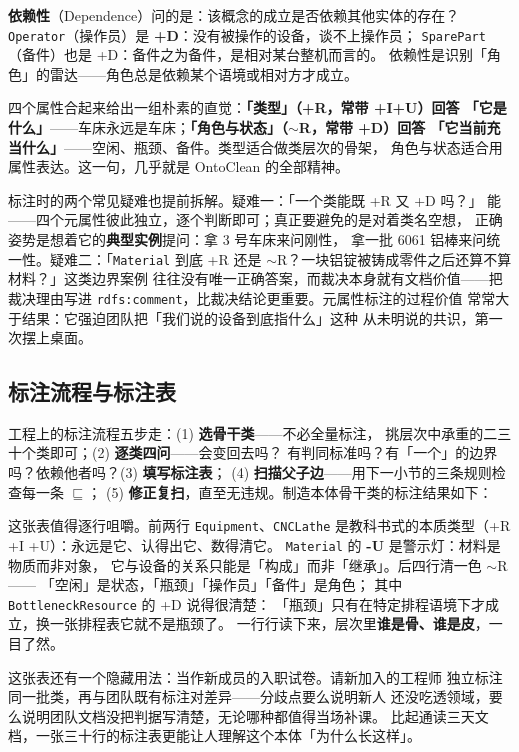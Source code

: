 \textbf{依赖性}（Dependence）问的是：该概念的成立是否依赖其他实体的存在？
\texttt{Operator}（操作员）是 \textbf{+D}：没有被操作的设备，谈不上操作员；
\texttt{SparePart}（备件）也是 +D：备件之为备件，是相对某台整机而言的。
依赖性是识别「角色」的雷达——角色总是依赖某个语境或相对方才成立。

四个属性合起来给出一组朴素的直觉：\textbf{「类型」（+R，常带 +I+U）回答
「它是什么」}——车床永远是车床；\textbf{「角色与状态」（\(\sim\)R，常带 +D）回答
「它当前充当什么」}——空闲、瓶颈、备件。类型适合做类层次的骨架，
角色与状态适合用属性表达。这一句，几乎就是 OntoClean 的全部精神。

标注时的两个常见疑难也提前拆解。疑难一：「一个类能既 +R 又 +D 吗？」
能——四个元属性彼此独立，逐个判断即可；真正要避免的是对着类名空想，
正确姿势是想着它的\textbf{典型实例}提问：拿 3 号车床来问刚性，
拿一批 6061 铝棒来问统一性。疑难二：「\texttt{Material} 到底 +R 还是
\(\sim\)R？一块铝锭被铸成零件之后还算不算材料？」这类边界案例
往往没有唯一正确答案，而裁决本身就有文档价值——把裁决理由写进
\texttt{rdfs:comment}，比裁决结论更重要。元属性标注的过程价值
常常大于结果：它强迫团队把「我们说的设备到底指什么」这种
从未明说的共识，第一次摆上桌面。

\subsection{标注流程与标注表}

工程上的标注流程五步走：(1) \textbf{选骨干类}——不必全量标注，
挑层次中承重的二三十个类即可；(2) \textbf{逐类四问}——会变回去吗？
有判同标准吗？有「一个」的边界吗？依赖他者吗？(3) \textbf{填写标注表}；
(4) \textbf{扫描父子边}——用下一小节的三条规则检查每一条 \(\sqsubseteq\)；
(5) \textbf{修正复扫}，直至无违规。制造本体骨干类的标注结果如下：



这张表值得逐行咀嚼。前两行 \texttt{Equipment}、\texttt{CNCLathe}
是教科书式的本质类型（+R +I +U）：永远是它、认得出它、数得清它。
\texttt{Material} 的 \textbf{-U} 是警示灯：材料是物质而非对象，
它与设备的关系只能是「构成」而非「继承」。后四行清一色 \(\sim\)R——
「空闲」是状态，「瓶颈」「操作员」「备件」是角色；
其中 \texttt{BottleneckResource} 的 +D 说得很清楚：
「瓶颈」只有在特定排程语境下才成立，换一张排程表它就不是瓶颈了。
一行行读下来，层次里\textbf{谁是骨、谁是皮}，一目了然。

这张表还有一个隐藏用法：当作新成员的入职试卷。请新加入的工程师
独立标注同一批类，再与团队既有标注对差异——分歧点要么说明新人
还没吃透领域，要么说明团队文档没把判据写清楚，无论哪种都值得当场补课。
比起通读三天文档，一张三十行的标注表更能让人理解这个本体「为什么长这样」。

